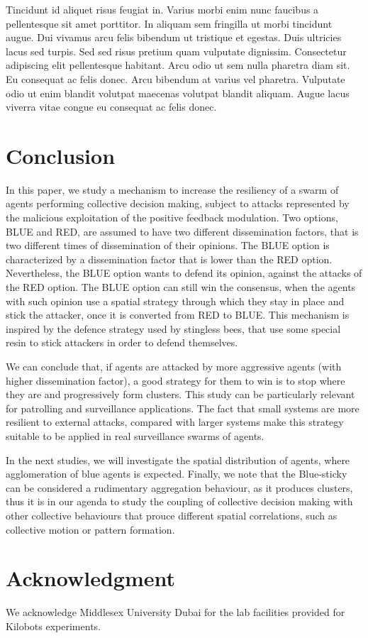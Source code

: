 \documentclass[journal]{IEEEtran}
\begin{document}
Tincidunt id aliquet risus feugiat in. Varius morbi enim nunc faucibus a pellentesque sit amet porttitor. In aliquam sem fringilla ut morbi tincidunt augue. Dui vivamus arcu felis bibendum ut tristique et egestas. Duis ultricies lacus sed turpis. Sed sed risus pretium quam vulputate dignissim. Consectetur adipiscing elit pellentesque habitant. Arcu odio ut sem nulla pharetra diam sit. Eu consequat ac felis donec. Arcu bibendum at varius vel pharetra. Vulputate odio ut enim blandit volutpat maecenas volutpat blandit aliquam. Augue lacus viverra vitae congue eu consequat ac felis donec.


\section{Conclusion}
In this paper, we study a mechanism to increase the resiliency of a swarm of agents performing collective decision making, subject to attacks represented by the malicious exploitation of the positive feedback modulation. Two options, BLUE and RED, are assumed to have two different dissemination factors, that is two different times of dissemination of their opinions. The BLUE option is characterized by a dissemination factor that is lower than the RED option. Nevertheless, the BLUE option wants to defend its opinion, against the attacks of the RED option. The BLUE option can still win the consensus, when the agents with such opinion use a  spatial strategy through which they stay in place and stick the attacker, once it is converted from RED to BLUE. 
This mechanism is  inspired by the defence strategy used by stingless bees, that use some special resin to stick attackers in order to defend themselves. 

We can conclude that, if agents are attacked by more aggressive agents (with higher dissemination factor), a good strategy for them to win is to stop where they are and progressively form clusters. This study can be particularly relevant for patrolling and surveillance applications. The fact that small systems are more resilient to external attacks, compared with larger systems make this strategy suitable to be applied in real surveillance swarms of agents.

In the next studies, we will investigate the spatial distribution of agents, where agglomeration of blue agents is expected.  Finally, we note that the Blue-sticky can be considered a rudimentary aggregation behaviour, as it produces clusters, thus it is in our agenda to study the coupling of collective decision making with other collective behaviours that prouce different spatial correlations, such as collective motion or pattern formation. 

\section*{Acknowledgment}
We acknowledge Middlesex University Dubai for the lab facilities provided for Kilobots experiments.



\end{document}
